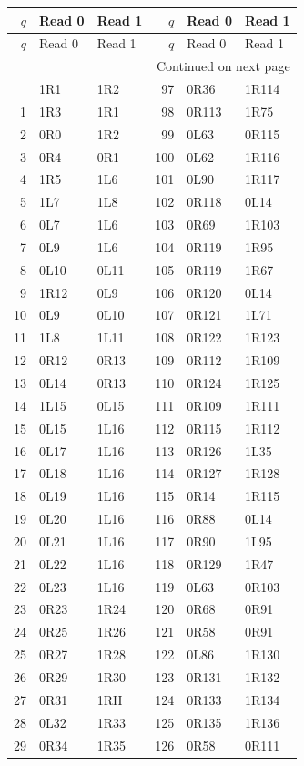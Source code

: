 {\small\ttfamily
\setlength{\tabcolsep}{13pt}
\begin{longtable}{@{}rll@{\hspace{32pt}}rll@{}}
\toprule
$q$ & Read 0 & Read 1 & $q$ & Read 0 & Read 1\\\midrule
\endfirsthead
\toprule
$q$ & Read 0 & Read 1 & $q$ & Read 0 & Read 1\\\midrule
\endhead
\midrule\multicolumn{6}{r}{\normalfont Continued on next page}\\\endfoot
\bottomrule\endlastfoot
0&1R1&1R2&97&0R36&1R114\\
1&1R3&1R1&98&0R113&1R75\\
2&0R0&1R2&99&0L63&0R115\\
3&0R4&0R1&100&0L62&1R116\\
4&1R5&1L6&101&0L90&1R117\\
5&1L7&1L8&102&0R118&0L14\\
6&0L7&1L6&103&0R69&1R103\\
7&0L9&1L6&104&0R119&1R95\\
8&0L10&0L11&105&0R119&1R67\\
9&1R12&0L9&106&0R120&0L14\\
10&0L9&0L10&107&0R121&1L71\\
11&1L8&1L11&108&0R122&1R123\\
12&0R12&0R13&109&0R112&1R109\\
13&0L14&0R13&110&0R124&1R125\\
14&1L15&0L15&111&0R109&1R111\\
15&0L15&1L16&112&0R115&1R112\\
16&0L17&1L16&113&0R126&1L35\\
17&0L18&1L16&114&0R127&1R128\\
18&0L19&1L16&115&0R14&1R115\\
19&0L20&1L16&116&0R88&0L14\\
20&0L21&1L16&117&0R90&1L95\\
21&0L22&1L16&118&0R129&1R47\\
22&0L23&1L16&119&0L63&0R103\\
23&0R23&1R24&120&0R68&0R91\\
24&0R25&1R26&121&0R58&0R91\\
25&0R27&1R28&122&0L86&1R130\\
26&0R29&1R30&123&0R131&1R132\\
27&0R31&1RH&124&0R133&1R134\\
28&0L32&1R33&125&0R135&1R136\\
29&0R34&1R35&126&0R58&0R111\\

\end{longtable}}
